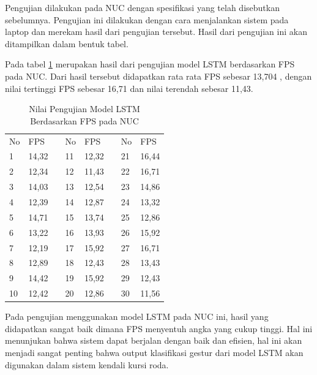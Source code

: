 Pengujian dilakukan pada NUC dengan spesifikasi yang telah disebutkan sebelumnya. Pengujian ini dilakukan dengan cara menjalankan sistem pada laptop dan merekam hasil dari pengujian tersebut. Hasil dari pengujian ini akan ditampilkan dalam bentuk tabel.

Pada tabel \ref{tb:TabelLSTMNUC} merupakan hasil dari pengujian model LSTM berdasarkan FPS pada NUC. Dari hasil tersebut didapatkan rata rata FPS sebesar 13,704 , dengan nilai tertinggi FPS sebesar 16,71 dan nilai terendah sebesar 11,43. 


\begin{table}[H]
  \centering
  \caption{Nilai Pengujian Model LSTM Berdasarkan FPS pada NUC} 
  \label{tb:TabelLSTMNUC}
  \begin{tabular}{|l|l|l|l|l|l|l|l|}
  \cline{1-2} \cline{4-5} \cline{7-8}
  No & FPS   &  & No & FPS   &  & No & FPS   \\ \cline{1-2} \cline{4-5} \cline{7-8} 
  1  & 14,32 &  & 11 & 12,32 &  & 21 & 16,44 \\ \cline{1-2} \cline{4-5} \cline{7-8} 
  2  & 12,34 &  & 12 & 11,43 &  & 22 & 16,71 \\ \cline{1-2} \cline{4-5} \cline{7-8} 
  3  & 14,03 &  & 13 & 12,54 &  & 23 & 14,86 \\ \cline{1-2} \cline{4-5} \cline{7-8} 
  4  & 12,39 &  & 14 & 12,87 &  & 24 & 13,32 \\ \cline{1-2} \cline{4-5} \cline{7-8} 
  5  & 14,71 &  & 15 & 13,74 &  & 25 & 12,86 \\ \cline{1-2} \cline{4-5} \cline{7-8} 
  6  & 13,22 &  & 16 & 13,93 &  & 26 & 15,92 \\ \cline{1-2} \cline{4-5} \cline{7-8} 
  7  & 12,19 &  & 17 & 15,92 &  & 27 & 16,71 \\ \cline{1-2} \cline{4-5} \cline{7-8} 
  8  & 12,89 &  & 18 & 12,43 &  & 28 & 13,43 \\ \cline{1-2} \cline{4-5} \cline{7-8} 
  9  & 14,42 &  & 19 & 15,92 &  & 29 & 12,43 \\ \cline{1-2} \cline{4-5} \cline{7-8} 
  10 & 12,42 &  & 20 & 12,86 &  & 30 & 11,56 \\ \cline{1-2} \cline{4-5} \cline{7-8} 
  \end{tabular}
\end{table}

Pada pengujian menggunakan model LSTM pada NUC ini, hasil yang didapatkan sangat baik dimana FPS menyentuh angka yang cukup tinggi. Hal ini menunjukan bahwa sistem dapat berjalan dengan baik dan efisien, hal ini akan menjadi sangat penting bahwa output klasifikasi gestur dari model LSTM akan digunakan dalam sistem kendali kursi roda.

